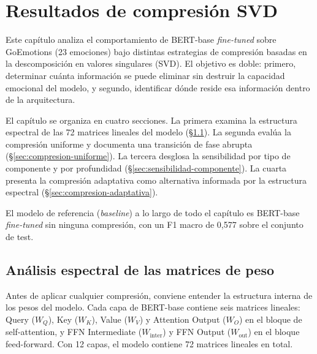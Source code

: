 
\section{Resultados de compresión SVD}
\label{sec:resultados-compresion}

Este capítulo analiza el comportamiento de BERT-base \emph{fine-tuned} sobre GoEmotions
(23 emociones) bajo distintas estrategias de compresión basadas en la descomposición
en valores singulares (SVD). El objetivo es doble: primero, determinar cuánta
información se puede eliminar sin destruir la capacidad emocional del modelo, y segundo,
identificar dónde reside esa información dentro de la arquitectura.

El capítulo se organiza en cuatro secciones. La primera examina la estructura espectral
de las 72 matrices lineales del modelo (\S\ref{sec:analisis-espectral}). La segunda
evalúa la compresión uniforme y documenta una transición de fase abrupta
(\S\ref{sec:compresion-uniforme}). La tercera desglosa la sensibilidad por tipo de
componente y por profundidad (\S\ref{sec:sensibilidad-componente}). La cuarta presenta
la compresión adaptativa como alternativa informada por la estructura espectral
(\S\ref{sec:compresion-adaptativa}).

El modelo de referencia (\emph{baseline}) a lo largo de todo el capítulo es BERT-base
\emph{fine-tuned} sin ninguna compresión, con un F1 macro de 0{,}577 sobre el conjunto de test.



\subsection{Análisis espectral de las matrices de peso}
\label{sec:analisis-espectral}

Antes de aplicar cualquier compresión, conviene entender la estructura interna de los
pesos del modelo. Cada capa de BERT-base contiene seis matrices lineales: Query ($W_Q$),
Key ($W_K$), Value ($W_V$) y Attention Output ($W_O$) en el bloque de self-attention, y
FFN Intermediate ($W_{\text{inter}}$) y FFN Output ($W_{\text{out}}$) en el bloque
feed-forward. Con 12 capas, el modelo contiene 72 matrices lineales en total.

